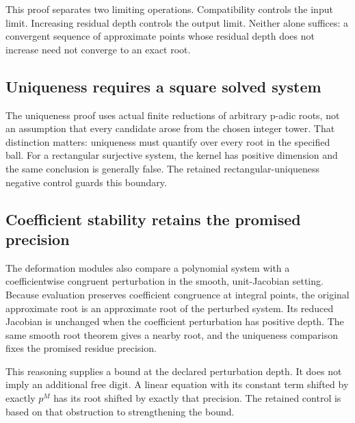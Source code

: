 This proof separates two limiting operations. Compatibility controls the input limit. Increasing residual depth controls the output limit. Neither alone suffices: a convergent sequence of approximate points whose residual depth does not increase need not converge to an exact root.

\subsection{Uniqueness requires a square solved system}

The uniqueness proof uses actual finite reductions of arbitrary p-adic roots, not an assumption that every candidate arose from the chosen integer tower. That distinction matters: uniqueness must quantify over every root in the specified ball. For a rectangular surjective system, the kernel has positive dimension and the same conclusion is generally false. The retained rectangular-uniqueness negative control guards this boundary.

\subsection{Coefficient stability retains the promised precision}
The deformation modules also compare a polynomial system with a coefficientwise congruent perturbation in the smooth, unit-Jacobian setting. Because evaluation preserves coefficient congruence at integral points, the original approximate root is an approximate root of the perturbed system. Its reduced Jacobian is unchanged when the coefficient perturbation has positive depth. The same smooth root theorem gives a nearby root, and the uniqueness comparison fixes the promised residue precision.

This reasoning supplies a bound at the declared perturbation depth. It does not imply an additional free digit. A linear equation with its constant term shifted by exactly $p^M$ has its root shifted by exactly that precision. The retained  control is based on that obstruction to strengthening the bound.
